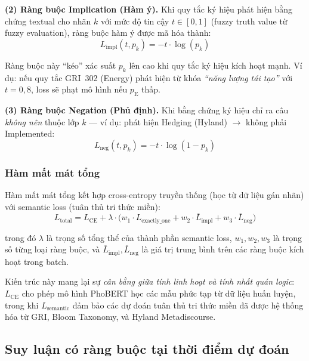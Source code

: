 \textbf{(2) Ràng buộc Implication (Hàm ý).} Khi quy tắc ký hiệu phát hiện bằng chứng textual cho nhãn $k$ với mức độ tin cậy $t \in [0,1]$ (fuzzy truth value từ fuzzy evaluation), ràng buộc hàm ý được mã hóa thành:
\begin{equation}
    L_{\text{impl}}(t, p_k) = -t \cdot \log(p_k)
    \label{eq:implication}
\end{equation}

\noindent Ràng buộc này ``kéo'' xác suất $p_k$ lên cao khi quy tắc ký hiệu kích hoạt mạnh. Ví dụ: nếu quy tắc GRI~302 (Energy) phát hiện từ khóa \textit{``năng lượng tái tạo''} với $t = 0{,}8$, loss sẽ phạt mô hình nếu $p_{\text{E}}$ thấp.

\textbf{(3) Ràng buộc Negation (Phủ định).} Khi bằng chứng ký hiệu chỉ ra câu \textit{không nên} thuộc lớp $k$ --- ví dụ: phát hiện Hedging (Hyland) $\rightarrow$ không phải Implemented:
\begin{equation}
    L_{\text{neg}}(t, p_k) = -t \cdot \log(1 - p_k)
    \label{eq:negation}
\end{equation}


\subsubsection{Hàm mất mát tổng}

Hàm mất mát tổng kết hợp cross-entropy truyền thống (học từ dữ liệu gán nhãn) với semantic loss (tuân thủ tri thức miền):
\begin{equation}
    L_{\text{total}} = L_{\text{CE}} + \lambda \cdot \Big(w_1 \cdot L_{\text{exactly\_one}} + w_2 \cdot \overline{L}_{\text{impl}} + w_3 \cdot \overline{L}_{\text{neg}}\Big)
    \label{eq:total_loss}
\end{equation}

\noindent trong đó $\lambda$ là trọng số tổng thể của thành phần semantic loss, $w_1, w_2, w_3$ là trọng số từng loại ràng buộc, và $\overline{L}_{\text{impl}}, \overline{L}_{\text{neg}}$ là giá trị trung bình trên các ràng buộc kích hoạt trong batch.

Kiến trúc này mang lại sự \textit{cân bằng giữa tính linh hoạt và tính nhất quán logic}: $L_{\text{CE}}$ cho phép mô hình PhoBERT học các mẫu phức tạp từ dữ liệu huấn luyện, trong khi $L_{\text{semantic}}$ đảm bảo các dự đoán tuân thủ tri thức miền đã được hệ thống hóa từ GRI, Bloom Taxonomy, và Hyland Metadiscourse.


\subsection{Suy luận có ràng buộc tại thời điểm dự đoán}
\label{subsec:constrained_inference}

